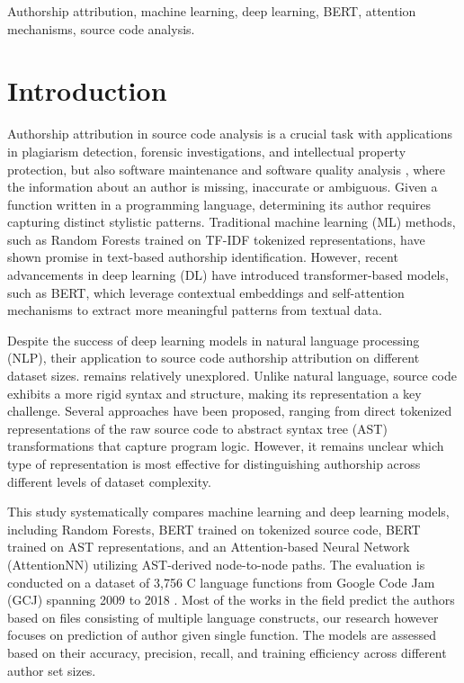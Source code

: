 \documentclass[conference]{IEEEtran}
\begin{document}
\begin{IEEEkeywords}
Authorship attribution, machine learning, deep learning, BERT, attention mechanisms, source code analysis.
\end{IEEEkeywords}

\section{Introduction}

Authorship attribution in source code analysis is a crucial task 
with applications in plagiarism detection, forensic investigations, and 
intellectual property protection, but also software maintenance 
and software quality analysis \cite{pbnn}, where the information about an author 
is missing, inaccurate or ambiguous.
Given a function written in a programming
language, determining its author requires capturing distinct stylistic 
patterns. Traditional machine learning (ML) methods, such as Random 
Forests trained on TF-IDF tokenized representations, have shown promise 
in text-based authorship identification. However, recent advancements 
in deep learning (DL) have introduced transformer-based models, such as 
BERT, which leverage contextual embeddings and self-attention mechanisms 
to extract more meaningful patterns from textual data.

Despite the success of deep learning models in natural language 
processing (NLP), their application to source code authorship attribution on different dataset sizes. 
remains relatively unexplored. Unlike natural language, source code 
exhibits a more rigid syntax and structure, making its representation 
a key challenge. Several approaches have been proposed, ranging from 
direct tokenized representations of the raw source code to abstract 
syntax tree (AST) transformations that capture program logic. However, 
it remains unclear which type of representation is most effective for 
distinguishing authorship across different levels of dataset complexity.

This study systematically compares machine learning and deep learning 
models, including Random Forests, BERT trained on tokenized source code, 
BERT trained on AST representations, and an Attention-based Neural Network 
(AttentionNN) utilizing AST-derived node-to-node paths. The evaluation is 
conducted on a dataset of 3,756 C language functions from Google Code Jam 
(GCJ) spanning 2009 to 2018 \cite{gcj}. Most of the works in the field
predict the authors based on files consisting of multiple language constructs, our 
research however focuses on prediction of author given single function.
The models are assessed based on their accuracy, precision, recall, and training efficiency across different 
author set sizes.
\end{document}

